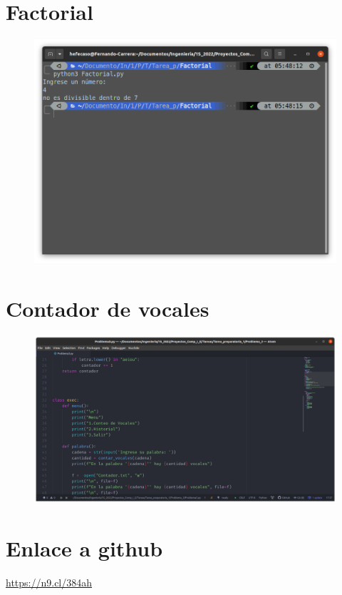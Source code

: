 \documentclass[12pt,letterpaper]{article}
\begin{document}
\begin{multicols}{2}
\section{Factorial}


\begin{figure}[H]
\centering
\includegraphics[width = \columnwidth]{5-py_factorial.png}
\end{figure}

\section{Contador de vocales}


\begin{figure}[H]
\centering
\includegraphics[width = \columnwidth]{6-py_contar_vocales.png}
\end{figure}

\section{Enlace a github}

\url{https://n9.cl/384ah}

\end{multicols}
\balance
\end{document}
